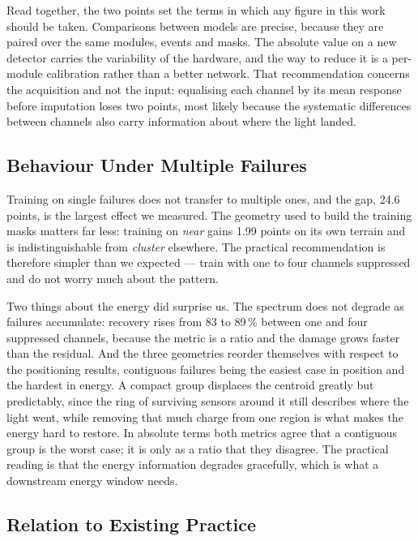 \documentclass[10pt,conference]{IEEEtran}
\begin{document}
Read together, the two points set the terms in which any figure in this work
should be taken. Comparisons between models are precise, because they are
paired over the same modules, events and masks. The absolute value on a new
detector carries the variability of the hardware, and the way to reduce it is a
per-module calibration rather than a better network. That recommendation
concerns the acquisition and not the input: equalising each channel by its mean
response before imputation loses two points, most likely because the systematic
differences between channels also carry information about where the light
landed.

\subsection{Behaviour Under Multiple Failures}

Training on single failures does not transfer to multiple ones, and the gap,
24.6 points, is the largest effect we measured. The geometry used to build the
training masks matters far less: training on \emph{near} gains 1.99 points on
its own terrain and is indistinguishable from \emph{cluster} elsewhere. The
practical recommendation is therefore simpler than we expected --- train with
one to four channels suppressed and do not worry much about the pattern.

Two things about the energy did surprise us. The spectrum does not degrade as
failures accumulate: recovery rises from 83 to 89\,\% between one and four
suppressed channels, because the metric is a ratio and the damage grows faster
than the residual. And the three geometries reorder themselves with respect to
the positioning results, contiguous failures being the easiest case in position
and the hardest in energy. A compact group displaces the centroid greatly but
predictably, since the ring of surviving sensors around it still describes
where the light went, while removing that much charge from one region is what
makes the energy hard to restore. In absolute terms both metrics agree that a
contiguous group is the worst case; it is only as a ratio that they disagree.
The practical reading is that the energy information degrades gracefully, which
is what a downstream energy window needs.

\subsection{Relation to Existing Practice}
\end{document}
